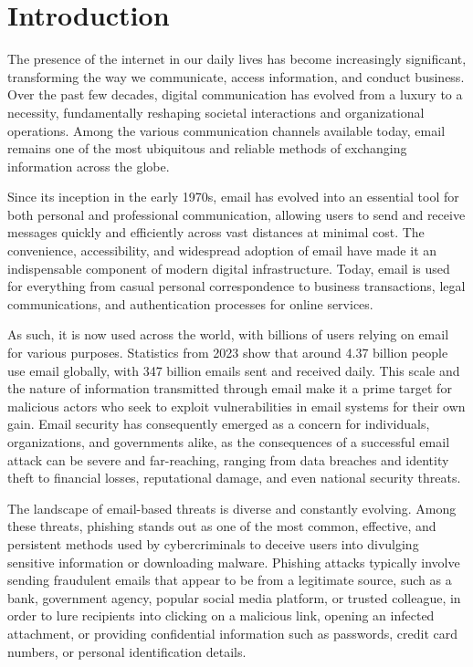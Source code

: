 \chapter{Introduction}%
\label{chapter:introduction}

The presence of the internet in our daily lives has become increasingly significant, transforming the way we communicate, access information, and conduct business. Over the past few decades, digital communication has evolved from a luxury to a necessity, fundamentally reshaping societal interactions and organizational operations. Among the various communication channels available today, email remains one of the most ubiquitous and reliable methods of exchanging information across the globe.

Since its inception in the early 1970s, email has evolved into an essential tool for both personal and professional communication, allowing users to send and receive messages quickly and efficiently across vast distances at minimal cost. The convenience, accessibility, and widespread adoption of email have made it an indispensable component of modern digital infrastructure. Today, email is used for everything from casual personal correspondence to business transactions, legal communications, and authentication processes for online services.

As such, it is now used across the world, with billions of users relying on email for various purposes. Statistics from 2023 show that around 4.37 billion people use email globally, with 347 billion emails sent and received daily\cite{statista_email}. This scale and the nature of information transmitted through email make it a prime target for malicious actors who seek to exploit vulnerabilities in email systems for their own gain. Email security has consequently emerged as a concern for individuals, organizations, and governments alike, as the consequences of a successful email attack can be severe and far-reaching, ranging from data breaches and identity theft to financial losses, reputational damage, and even national security threats.

The landscape of email-based threats is diverse and constantly evolving. Among these threats, phishing stands out as one of the most common, effective, and persistent methods used by cybercriminals to deceive users into divulging sensitive information or downloading malware. Phishing attacks typically involve sending fraudulent emails that appear to be from a legitimate source, such as a bank, government agency, popular social media platform, or trusted colleague, in order to lure recipients into clicking on a malicious link, opening an infected attachment, or providing confidential information such as passwords, credit card numbers, or personal identification details.


